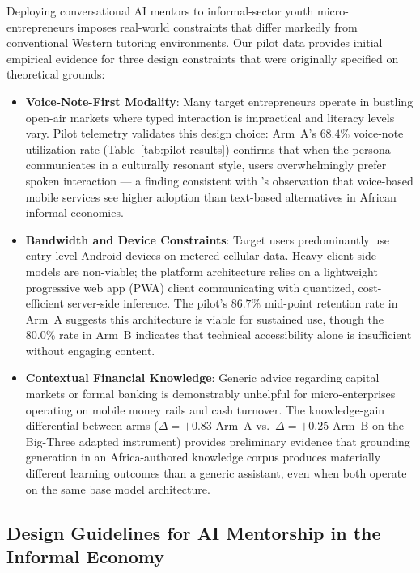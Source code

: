 Deploying conversational AI mentors to informal-sector youth micro-entrepreneurs imposes real-world constraints that differ markedly from conventional Western tutoring environments. Our pilot data provides initial empirical evidence for three design constraints that were originally specified on theoretical grounds:
\begin{itemize}
    \item \textbf{Voice-Note-First Modality}: Many target entrepreneurs operate in bustling open-air markets where typed interaction is impractical and literacy levels vary. Pilot telemetry validates this design choice: Arm~A's $68.4\%$ voice-note utilization rate (Table~\ref{tab:pilot-results}) confirms that when the persona communicates in a culturally resonant style, users overwhelmingly prefer spoken interaction --- a finding consistent with \citet{aker2010mobile}'s observation that voice-based mobile services see higher adoption than text-based alternatives in African informal economies.
    \item \textbf{Bandwidth and Device Constraints}: Target users predominantly use entry-level Android devices on metered cellular data. Heavy client-side models are non-viable; the platform architecture relies on a lightweight progressive web app (PWA) client communicating with quantized, cost-efficient server-side inference. The pilot's $86.7\%$ mid-point retention rate in Arm~A suggests this architecture is viable for sustained use, though the $80.0\%$ rate in Arm~B indicates that technical accessibility alone is insufficient without engaging content.
    \item \textbf{Contextual Financial Knowledge}: Generic advice regarding capital markets or formal banking is demonstrably unhelpful for micro-enterprises operating on mobile money rails and cash turnover. The knowledge-gain differential between arms ($\Delta = +0.83$ Arm~A vs.\ $\Delta = +0.25$ Arm~B on the Big-Three adapted instrument) provides preliminary evidence that grounding generation in an Africa-authored knowledge corpus produces materially different learning outcomes than a generic assistant, even when both operate on the same base model architecture.
\end{itemize}

\subsection{Design Guidelines for AI Mentorship in the Informal Economy}
\label{subsec:discussion-guidelines}

